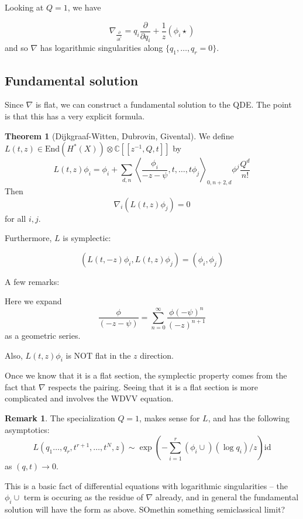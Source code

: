\documentclass{amsart}
\theoremstyle{definition}
\newtheorem{remark}[dummy]{Remark}
\newtheorem{theorem}[dummy]{Theorem}
\newcommand{\C}{\mathbb{C}}
\begin{document}
Looking at $Q=1$, we have

$$\nabla_{\frac{\partial}{\partial t^i}}=q_i\frac{\partial}{\partial q_i}+\frac{1}{z}(\phi_i\star)$$
and so $\nabla$ has logarithmic singularities along $\{q_1,\dots, q_r=0\}$.


\subsection{Fundamental solution}

Since $\nabla$ is flat, we can construct a fundamental solution to the QDE.  The point is that this has a very explicit formula.

\begin{theorem}[Dijkgraaf-Witten, Dubrovin, Givental]

We define
$L(t,z)\in\text{End}(H^*(X))\otimes\C[[z^{-1},Q,t]]$
by
$$L(t,z)\phi_i=\phi_i+\sum_{d,n}\left\langle\frac{\phi_i}{-z-\psi},t,\dots,t\phi_j   \right\rangle_{0,n+2 ,d}\phi^j\frac{Q^d}{n!}$$
Then
$$\nabla_i(L(t,z)\phi_j)=0$$
for all $i, j$.

Furthermore, $L$ is symplectic:

$$\left( L(t,-z)\phi_i, L(t,z)\phi_j\right)=(\phi_i,\phi_j)$$


\end{theorem}

A few remarks:

Here we expand 
$$\frac{\phi}{(-z-\psi)}=\sum_{n=0}^\infty \frac{\phi(-\psi)^n}{(-z)^{n+1}}$$
as a geometric series.

Also, $L(t,z)\phi_i$ is NOT flat in the $z$ direction.

Once we know that it is a flat section, the symplectic property comes from the fact that $\nabla$ respects the pairing.  Seeing that it is a flat section is more complicated and involves the WDVV equation.

\begin{remark}
The specialization $Q=1$, makes sense for $L$, and has the following asymptotics:
$$L(q_1\dots, q_r, t^{r+1},\dots, t^N,z)\sim \exp(- \sum_{i=1}^r(\phi_i\cup)(\log q_i)/z)\text{id}$$
as $(q,t)\to 0$.

This is a basic fact of differential equations with logarithmic singularities -- the $\phi_i\cup$ term is occuring as the residue of $\nabla$ already, and in general the fundamental solution will have the form as above.  SOmethin something semiclassical limit?

\end{remark}
\end{document}

